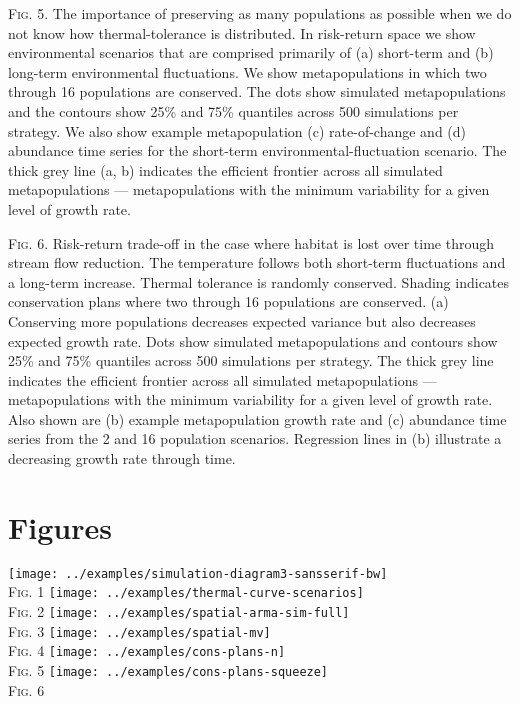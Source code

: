 \documentclass[12pt,english]{article}
\begin{document}
\begin{spacing}{1.9}

\bigskip
\noindent
\textsc{Fig. 5}. The importance of preserving as many populations as possible when we do not know how thermal-tolerance is distributed. In risk-return space we show environmental scenarios that are comprised primarily of (a) short-term and (b) long-term environmental fluctuations. We show metapopulations in which two through 16 populations are conserved. The dots show simulated metapopulations and the contours show 25\% and 75\% quantiles across 500 simulations per strategy. We also show example metapopulation (c) rate-of-change and (d) abundance time series for the short-term environmental-fluctuation scenario. The thick grey line (a, b) indicates the efficient frontier across all simulated metapopulations --- metapopulations with the minimum variability for a given level of growth rate.

\bigskip
\noindent
\textsc{Fig. 6}. Risk-return trade-off in the case where habitat is lost over time through stream flow reduction. The temperature follows both short-term fluctuations and a long-term increase. Thermal tolerance is randomly conserved. Shading indicates conservation plans where two through 16 populations are conserved. (a) Conserving more populations decreases expected variance but also decreases expected growth rate. Dots show simulated metapopulations and contours show 25\% and 75\% quantiles across 500 simulations per strategy. The thick grey line indicates the efficient frontier across all simulated metapopulations --- metapopulations with the minimum variability for a given level of growth rate. Also shown are (b) example metapopulation growth rate and (c) abundance time series from the 2 and 16 population scenarios. Regression lines in (b) illustrate a decreasing growth rate through time.

\clearpage

\section{Figures}

\begin{center}
\texttt{[image: ../examples/simulation-diagram3-sansserif-bw]}\\
\textsc{Fig.} 1
\clearpage
\texttt{[image: ../examples/thermal-curve-scenarios]}\\
\textsc{Fig.} 2
\clearpage
\texttt{[image: ../examples/spatial-arma-sim-full]}\\
\textsc{Fig.} 3
\clearpage
\texttt{[image: ../examples/spatial-mv]}\\
\textsc{Fig.} 4
\clearpage
\texttt{[image: ../examples/cons-plans-n]}\\
\textsc{Fig.} 5
\clearpage
\texttt{[image: ../examples/cons-plans-squeeze]}\\
\textsc{Fig.} 6
\clearpage
\end{center}

\end{spacing}
\end{document}
